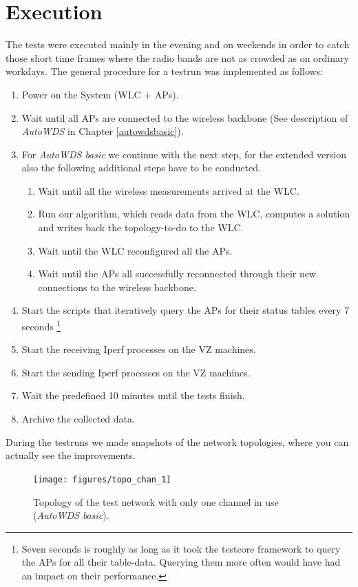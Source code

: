  \section{Execution}
    The tests were executed mainly in the evening and on weekends in order to catch those short time frames where the radio bands are not as crowded as on ordinary workdays.
    The general procedure for a testrun was implemented as follows:
    \begin{enumerate}
      \item Power on the System (\ac{WLC} + APs).
      \item Wait until all APs are connected to the wireless backbone (See description of \textit{AutoWDS} in Chapter \ref{autowdsbasic}).
      \item For \textit{AutoWDS basic} we continue with the next step, for the extended version also the following additional steps have to be conducted.
	\begin{enumerate}
	 \item Wait until all the wireless measurements arrived at the \ac{WLC}.
	 \item Run our algorithm, which reads data from the \ac{WLC}, computes a solution and writes back the topology-to-do to the \ac{WLC}.
	 \item Wait until the \ac{WLC} reconfigured all the APs.
	 \item Wait until the APs all successfully reconnected through their new connections to the wireless backbone.
	\end{enumerate}
      \item Start the scripts that iteratively query the APs for their status tables every 7 seconds \footnote{Seven seconds is roughly as long as it took the testcore
      framework to query the APs for all their table-data. Querying them more often would have had an impact on their performance.}
      \item Start the receiving Iperf processes on the VZ machines.
      \item Start the sending Iperf processes on the VZ machines.
      \item Wait the predefined 10 minutes until the tests finish.
      \item Archive the collected data.
    \end{enumerate}
    
\newpage

    During the testruns we made snapshots of the network topologies, where you can actually see the improvements.    
    \begin{figure}[h!]
      \centering
	\texttt{[image: figures/topo\_chan\_1]}
	\caption{Topology of the test network with only one channel in use (\textit{AutoWDS basic}).\protect\footnotemark }
      \label{fig:topo_chan_1}
    \end{figure}
    
